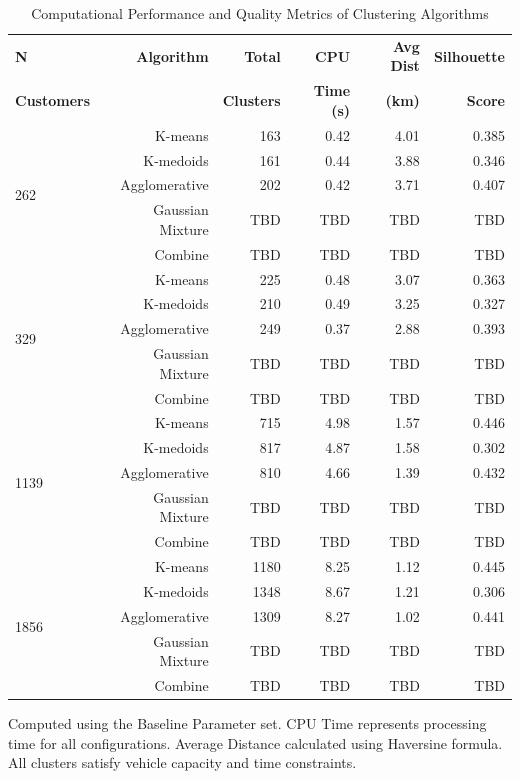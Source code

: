 \begin{table}[htbp]
\centering
\caption{Computational Performance and Quality Metrics of Clustering Algorithms}
\begin{threeparttable}
\begin{tabular}{lrrrrr}
\toprule
\textbf{N} & \textbf{Algorithm} & \textbf{Total} & \textbf{CPU} & \textbf{Avg Dist} & \textbf{Silhouette} \\
\textbf{Customers} & & \textbf{Clusters} & \textbf{Time (s)} & \textbf{(km)} & \textbf{Score} \\
\midrule
\multirow{5}{*}{262} 
& K-means & 163 & 0.42 & 4.01 & 0.385 \\
& K-medoids & 161 & 0.44 & 3.88 & 0.346 \\
& Agglomerative & 202 & 0.42 & 3.71 & 0.407 \\
& Gaussian Mixture & TBD & TBD & TBD & TBD \\
& Combine & TBD & TBD & TBD & TBD \\
\midrule
\multirow{5}{*}{329} 
& K-means & 225 & 0.48 & 3.07 & 0.363 \\
& K-medoids & 210 & 0.49 & 3.25 & 0.327 \\
& Agglomerative & 249 & 0.37 & 2.88 & 0.393 \\
& Gaussian Mixture & TBD & TBD & TBD & TBD \\
& Combine & TBD & TBD & TBD & TBD \\
\midrule
\multirow{5}{*}{1139} 
& K-means & 715 & 4.98 & 1.57 & 0.446 \\
& K-medoids & 817 & 4.87 & 1.58 & 0.302 \\
& Agglomerative & 810 & 4.66 & 1.39 & 0.432 \\
& Gaussian Mixture & TBD & TBD & TBD & TBD \\
& Combine & TBD & TBD & TBD & TBD \\
\midrule
\multirow{5}{*}{1856} 
& K-means & 1180 & 8.25 & 1.12 & 0.445 \\
& K-medoids & 1348 & 8.67 & 1.21 & 0.306 \\
& Agglomerative & 1309 & 8.27 & 1.02 & 0.441 \\
& Gaussian Mixture & TBD & TBD & TBD & TBD \\
& Combine & TBD & TBD & TBD & TBD \\
\bottomrule
\end{tabular}
\begin{tablenotes}
\item[] Computed using the Baseline Parameter set. CPU Time represents processing time for all configurations. Average Distance calculated using Haversine formula. All clusters satisfy vehicle capacity and time constraints. 
\end{tablenotes}
\end{threeparttable}
\label{tab:clustering-performance}
\end{table}

